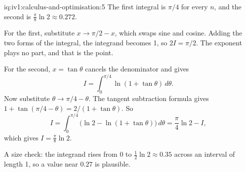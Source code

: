 \begin{solution}{iq:iv1:calculus-and-optimisation:5}
The first integral is $\pi/4$ for every $n$, and the second is $\frac{\pi}{8}\ln 2 \approx 0.272$.

For the first, substitute $x \to \pi/2 - x$, which swaps sine and cosine. Adding the two forms of the integral, the integrand becomes 1, so $2I = \pi/2$. The exponent plays no part, and that is the point.

For the second, $x = \tan\theta$ cancels the denominator and gives
\[
I = \int_0^{\pi/4}\ln(1 + \tan\theta)\,d\theta.
\]
Now substitute $\theta \to \pi/4 - \theta$. The tangent subtraction formula gives $1 + \tan(\pi/4 - \theta) = 2/(1 + \tan\theta)$. So
\[
I = \int_0^{\pi/4}\bigl(\ln 2 - \ln(1 + \tan\theta)\bigr)\,d\theta = \frac{\pi}{4}\ln 2 - I,
\]
which gives $I = \frac{\pi}{8}\ln 2$.

A size check: the integrand rises from 0 to $\frac12\ln 2 \approx 0.35$ across an interval of length 1, so a value near $0.27$ is plausible.



\end{solution}

